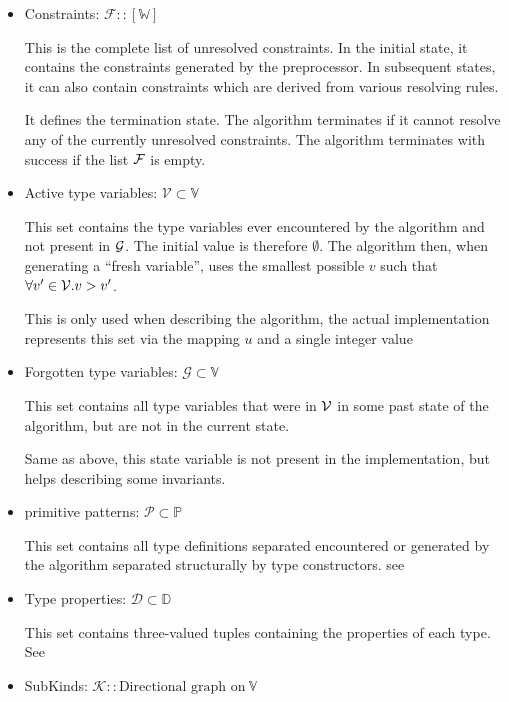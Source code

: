 \begin{itemize}
    \item Constraints: $\mathcal{F} :: [\mathbb{W}]$

    This is the complete list of unresolved constraints. In the initial state, it contains the constraints generated by the preprocessor. In subsequent states, it can also contain constraints which are derived from various resolving rules.

    It defines the termination state. The algorithm terminates if it cannot resolve any of the currently unresolved constraints. The algorithm terminates with success if the list $\mathcal F$ is empty.

    \item Active type variables: $\mathcal{V} \subset \mathbb{V}$

    This set contains the type variables ever encountered by the algorithm and not present in $\mathcal G$. The initial value is therefore $\emptyset$. The algorithm then, when generating a ``fresh variable'', uses the smallest possible $v$ such that $\forall v' \in \mathcal V. v > v'$.

    This is only used when describing the algorithm, the actual implementation represents this set via the mapping $u$ and a single integer value

    \item Forgotten type variables: $\mathcal{G} \subset \mathbb{V}$

    This set contains all type variables that were in $\mathcal V$ in some past state of the algorithm, but are not in the current state.

    Same as above, this state variable is not present in the implementation, but helps describing some invariants.

    \item primitive patterns: $\mathcal{P} \subset \mathbb{P}$

    This set contains all type definitions separated encountered or generated by the algorithm separated structurally by type constructors. see 

    \item Type properties: $\mathcal{D} \subset \mathbb{D}$

    This set contains three-valued tuples containing the properties of each type. See 

    \item SubKinds: $\mathcal{K} :: \text{Directional graph on}\ \mathbb{V}$


\end{itemize}
